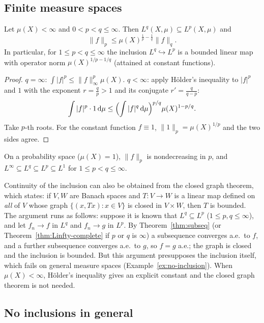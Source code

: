 \documentclass[11pt]{article}
\newcommand{\norm}[1]{\lVert #1\rVert}
\newcommand{\dmu}{\,\mathrm{d}\mu}
\begin{document}
\subsection{Finite measure spaces}

\begin{theorem}\label{thm:finite-inclusion}
Let $\mu(X)<\infty$ and $0<p<q\le\infty$. Then $L^{q}(X,\mu)\subseteq L^{p}(X,\mu)$ and
\[
\norm{f}_{p}\le\mu(X)^{\frac1p-\frac1q}\norm{f}_{q}.
\]
In particular, for $1\le p<q\le\infty$ the inclusion $L^{q}\hookrightarrow L^{p}$ is a bounded linear map with operator norm $\mu(X)^{1/p-1/q}$ (attained at constant functions).
\end{theorem}

\begin{proof}
$q=\infty$: $\int|f|^{p}\le\norm{f}_{\infty}^{p}\mu(X)$. $q<\infty$: apply Hölder's inequality to $|f|^{p}$ and $1$ with the exponent $r=\frac qp>1$ and its conjugate $r'=\frac{q}{q-p}$:
\[
\int|f|^{p}\cdot1\dmu\le\Bigl(\int|f|^{q}\dmu\Bigr)^{p/q}\mu(X)^{1-p/q}.
\]
Take $p$-th roots. For the constant function $f\equiv1$, $\norm{1}_{p}=\mu(X)^{1/p}$ and the two sides agree.
\end{proof}

On a probability space ($\mu(X)=1$), $\norm{f}_{p}$ is nondecreasing in $p$, and $L^{\infty}\subseteq L^{q}\subseteq L^{p}\subseteq L^{1}$ for $1\le p<q\le\infty$.

\begin{remark}
Continuity of the inclusion can also be obtained from the closed graph theorem, which states: if $V,W$ are Banach spaces and $T:V\to W$ is a linear map defined on \emph{all} of $V$ whose graph $\{(x,Tx):x\in V\}$ is closed in $V\times W$, then $T$ is bounded. The argument runs as follows: suppose it is known that $L^{q}\subseteq L^{p}$ ($1\le p,q\le\infty$), and let $f_{n}\to f$ in $L^{q}$ and $f_{n}\to g$ in $L^{p}$. By Theorem~\ref{thm:subseq} (or Theorem~\ref{thm:Linfty-complete} if $p$ or $q$ is $\infty$) a subsequence converges a.e.\ to $f$, and a further subsequence converges a.e.\ to $g$, so $f=g$ a.e.; the graph is closed and the inclusion is bounded. But this argument presupposes the inclusion itself, which fails on general measure spaces (Example~\ref{ex:no-inclusion}). When $\mu(X)<\infty$, Hölder's inequality gives an explicit constant and the closed graph theorem is not needed.
\end{remark}

\subsection{No inclusions in general}
\end{document}
